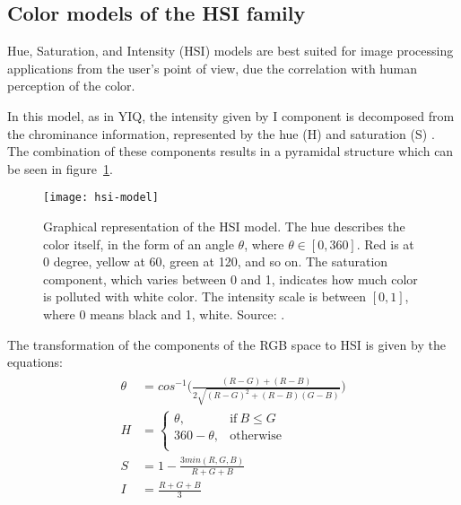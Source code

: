 \subsection{Color models of the HSI family}
\label{sec:modelo_cores_hsi}

Hue, Saturation, and Intensity (HSI) models are best suited for image processing applications from the user's point of view, due the correlation with human perception of the color\citep{konstantinos:00}.

In this model, as in YIQ, the intensity given by I component is decomposed from the chrominance information, represented by the hue (H) and saturation (S) \citep{konstantinos:00}. The combination of these components results in a pyramidal structure which can be seen in figure~\ref{fig:hsi-model}.

\begin{figure}[!ht]
  \centering
  \texttt{[image: hsi-model]}
  \caption[Graphical representation of the HSI model]{Graphical representation of the HSI model. The hue describes the color itself, in the form of an angle $\theta$, where $\theta \in [0, 360]$. Red is at 0 degree, yellow at 60, green at 120, and so on. The saturation component, which varies between 0 and 1, indicates how much color is polluted with white color. The intensity scale is between $[0, 1]$, where 0 means black and 1, white. Source: \citet{blackice:16}.}
  \label{fig:hsi-model} 
\end{figure}

The transformation of the components of the RGB space to HSI is given by the equations:
\begin{align}
\label{eq:rgb_para_hsi}
\begin{split}
  \theta &= cos^{-1} \bigg( \frac{(R - G) + (R - B)}{2 \sqrt{(R - G)^2 + (R - B)(G - B)}} \bigg)
  \\[0.5em]
  H &= \begin{cases}
            \theta,       & \text{if}\ B \leq G\\
            360 - \theta, & \text{otherwise}\\
       \end{cases}
  \\[0.5em]
  S &= 1 - \frac{3 min(R, G, B)}{R + G + B}
  \\[0.5em]
  I &= \frac{R + G + B}{3}
\end{split}
\end{align}

